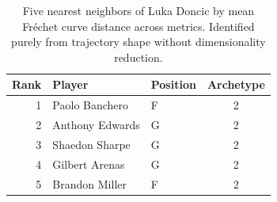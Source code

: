 \begin{table}[htbp]
  \centering\small
  \begin{tabular}{rllc}
    \toprule
    Rank & Player & Position & Archetype \\
    \midrule
    1 & Paolo Banchero & F & 2 \\
    2 & Anthony Edwards & G & 2 \\
    3 & Shaedon Sharpe & G & 2 \\
    4 & Gilbert Arenas & G & 2 \\
    5 & Brandon Miller & F & 2 \\
    \bottomrule
  \end{tabular}
  \caption{Five nearest neighbors of Luka Doncic by mean Fr\'{e}chet curve distance across metrics. Identified purely from trajectory shape without dimensionality reduction.}
  \label{tab:Luka_Doncic_frechet_curve_neighbors}
\end{table}


